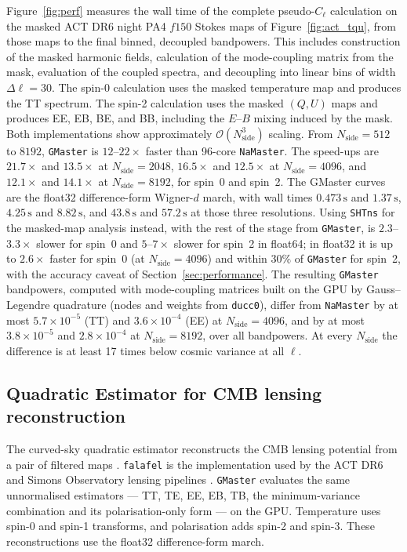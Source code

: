 \documentclass[letters,usenatbib,useAMS]{mnras}
\begin{document}
Figure~\ref{fig:perf} measures the wall time of the complete pseudo-$C_\ell$ calculation on the masked ACT DR6 night PA4 $f150$ Stokes maps of Figure~\ref{fig:act_tqu}, from those maps to the final binned, decoupled bandpowers. This includes construction of the masked harmonic fields, calculation of the mode-coupling matrix from the mask, evaluation of the coupled spectra, and decoupling into linear bins of width $\Delta\ell=30$. The spin-0 calculation uses the masked temperature map and produces the TT spectrum. The spin-2 calculation uses the masked $(Q,U)$ maps and produces EE, EB, BE, and BB, including the $E$--$B$ mixing induced by the mask. Both implementations show approximately $\mathcal{O}(N_{\mathrm{side}}^3)$ scaling. From $N_{\mathrm{side}}=512$ to $8192$, \texttt{GMaster} is $12$--$22\times$ faster than 96-core \texttt{NaMaster}. The speed-ups are $21.7\times$ and $13.5\times$ at $N_{\mathrm{side}}=2048$, $16.5\times$ and $12.5\times$ at $N_{\mathrm{side}}=4096$, and $12.1\times$ and $14.1\times$ at $N_{\mathrm{side}}=8192$, for spin~0 and spin~2. The GMaster curves are the float32 difference-form Wigner-$d$ march, with wall times $0.473\,\mathrm{s}$ and $1.37\,\mathrm{s}$, $4.25\,\mathrm{s}$ and $8.82\,\mathrm{s}$, and $43.8\,\mathrm{s}$ and $57.2\,\mathrm{s}$ at those three resolutions. Using \texttt{SHTns} for the masked-map analysis instead, with the rest of the stage from \texttt{GMaster}, is $2.3$--$3.3\times$ slower for spin~0 and $5$--$7\times$ slower for spin~2 in float64; in float32 it is up to $2.6\times$ faster for spin~0 (at $N_{\mathrm{side}}=4096$) and within $30\%$ of \texttt{GMaster} for spin~2, with the accuracy caveat of Section~\ref{sec:performance}. The resulting \texttt{GMaster} bandpowers, computed with mode-coupling matrices built on the GPU by Gauss--Legendre quadrature (nodes and weights from \texttt{ducc0}), differ from \texttt{NaMaster} by at most $5.7\times10^{-5}$ (TT) and $3.6\times10^{-4}$ (EE) at $N_{\mathrm{side}}=4096$, and by at most $3.8\times10^{-5}$ and $2.8\times10^{-4}$ at $N_{\mathrm{side}}=8192$, over all bandpowers. At every $N_{\mathrm{side}}$ the difference is at least 17 times below cosmic variance at all $\ell$.

\subsection{Quadratic Estimator for CMB lensing reconstruction}
The curved-sky quadratic estimator reconstructs the CMB lensing potential from a pair of filtered maps \citep{hu2002,okamoto2003}. \texttt{falafel} is the implementation used by the ACT DR6 and Simons Observatory lensing pipelines \citep{falafel}. \texttt{GMaster} evaluates the same unnormalised estimators --- TT, TE, EE, EB, TB, the minimum-variance combination and its polarisation-only form --- on the GPU. Temperature uses spin-0 and spin-1 transforms, and polarisation adds spin-2 and spin-3. These reconstructions use the float32 difference-form march.
\end{document}

